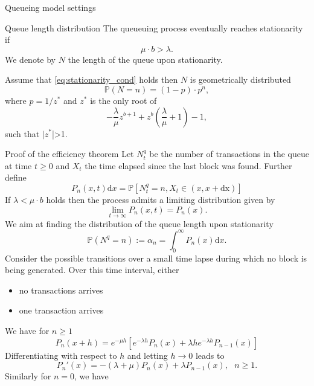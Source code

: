 \documentclass{beamer}
\begin{document}
{\begin{frame}{Queueing model settings}
\begin{thebibliography}{1}
\end{thebibliography}
\end{frame}
\begin{frame}{Queue length distribution}
The queueuing process eventually reaches stationarity if 
\begin{equation}\label{eq:stationarity_cond}
\mu\cdot b > \lambda.
\end{equation}
We denote by $N$ the length of the queue upon stationarity. 
\begin{theorem}
Assume that \eqref{eq:stationarity_cond} holds then $N$ is geometrically distributed 
$$
\mathbb{P}(N = n) = (1-p)\cdot p^n,
$$
where $p = 1/z^\ast$ and $z^\ast$ is the only root of 
$$
-\frac{\lambda}{\mu}z^{b+1}+z^b\left(\frac{\lambda}{\mu}+1\right) - 1,
$$
such that $|z^\ast$|>1.  
\end{theorem}
\end{frame}
\begin{frame}[allowframebreaks]{Proof of the efficiency theorem}
\scriptsize
Let $N^q_t$ be the number of transactions in the queue at time $t\geq0$ and $X_t$ the time elapsed since the last block was found. Further define
\[
P_{n}(x,t)\text{d}x  =\mathbb{P}[N_t^q = n, X_t \in(x, x + \text{dx})] 
\]
If $\lambda < \mu\cdot b$ holds then the process admits a limiting distribution given by 
\[
\underset{t\rightarrow\infty}{\lim}P_{n}(x,t) = P_{n}(x).
\]
We aim at finding the distribution of the queue length upon stationarity
\begin{equation}\label{eq:alpha_n}
\mathbb{P}(N^q=n):=\alpha_n =\int_{0}^\infty P_{n}(x)\text{d}x.
\end{equation}
Consider the possible transitions over a small time lapse  during which no block is being generated. Over this time interval, either 
\begin{itemize}
  \item no transactions arrives
  \item one transaction arrives
\end{itemize}
We have for $n\geq1$
\[
P_{n}(x+h) = e^{-\mu h}\left[e^{-\lambda h}P_{n}(x)+\lambda h e^{-\lambda h}P_{n-1}(x)\right]
\]
Differentiating with respect to $h$ and letting $h\rightarrow0$ leads to 
\begin{equation}\label{eq:diff_eq_n_geq_1}
P_{n}'(x) = -(\lambda+\mu)P_{n}(x)+\lambda P_{n-1}(x),\text{ }n \geq1.
\end{equation}
Similarly for $n = 0$, we have 
\begin{equation}\label{eq:diff_eq_n_eq_0}

\end{equation}
\end{frame}}
\end{document}

